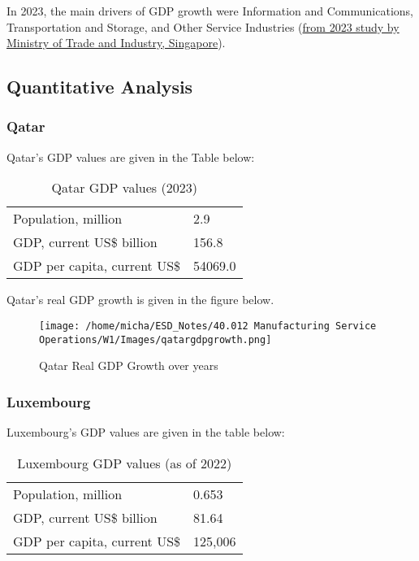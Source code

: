 \documentclass[12pt]{article}
\begin{document}
\noindent In 2023, the main drivers of GDP growth were Information and Communications, Transportation and Storage, and Other Service Industries (\href{https://www.mti.gov.sg/-/media/MTI/Resources/Economic-Survey-of-Singapore/2023/Economic-Survey-of-Singapore-2023/Ch1_AES2023.pdf}{from 2023 study by Ministry of Trade and Industry, Singapore}). 

\subsection*{Quantitative Analysis}

\subsubsection*{Qatar}

Qatar's GDP values are given in the Table below: 

\begin{table}[H]
    \centering
    \begin{tabular}{l l} \hline
        Population, million & 2.9 \\ 
        GDP, current US\$ billion & 156.8 \\ 
        GDP per capita, current US\$ & 54069.0 \\ \hline 
    \end{tabular}
    \caption{Qatar GDP values (2023)}
    \label{5-qatargdp}
\end{table}

\noindent Qatar's real GDP growth is given in the figure below. 

\begin{figure}[H]
    \centering
    \texttt{[image: /home/micha/ESD\_Notes/40.012 Manufacturing Service Operations/W1/Images/qatargdpgrowth.png]}
    \caption{Qatar Real GDP Growth over years}
    \label{fig:5-qatargdp}
\end{figure} 

\subsubsection*{Luxembourg}

Luxembourg's GDP values are given in the table below: 

\begin{table}[H]
    \centering
    \begin{tabular}{l l} \hline
        Population, million & 0.653 \\ 
        GDP, current US\$ billion & 81.64 \\ 
        GDP per capita, current US\$ & 125,006 \\ \hline 
    \end{tabular}
    \caption{Luxembourg GDP values (as of 2022)}
    \label{5-luxgdp}
\end{table}
\end{document}
